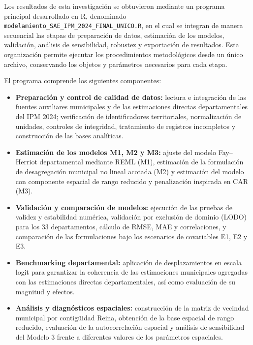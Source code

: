 Los resultados de esta investigación se obtuvieron mediante un programa principal desarrollado en R, denominado \texttt{modelamiento\_SAE\_IPM\_2024\_\allowbreak FINAL\_UNICO.R}, en el cual se integran de manera secuencial las etapas de preparación de datos, estimación de los modelos, validación, análisis de sensibilidad, robustez y exportación de resultados. Esta organización permite ejecutar los procedimientos metodológicos desde un único archivo, conservando los objetos y parámetros necesarios para cada etapa.

El programa comprende los siguientes componentes:

\begin{itemize}

    \item \textbf{Preparación y control de calidad de datos:} lectura e integración de las fuentes auxiliares municipales y de las estimaciones directas departamentales del IPM 2024; verificación de identificadores territoriales, normalización de unidades, controles de integridad, tratamiento de registros incompletos y construcción de las bases analíticas.

    \item \textbf{Estimación de los modelos M1, M2 y M3:} ajuste del modelo Fay--Herriot departamental mediante REML (M1), estimación de la formulación de desagregación municipal no lineal acotada (M2) y estimación del modelo con componente espacial de rango reducido y penalización inspirada en CAR (M3).

    \item \textbf{Validación y comparación de modelos:} ejecución de las pruebas de validez y estabilidad numérica, validación por exclusión de dominio (LODO) para los 33 departamentos, cálculo de RMSE, MAE y correlaciones, y comparación de las formulaciones bajo los escenarios de covariables E1, E2 y E3.

    \item \textbf{Benchmarking departamental:} aplicación de desplazamientos en escala logit para garantizar la coherencia de las estimaciones municipales agregadas con las estimaciones directas departamentales, así como evaluación de su magnitud y efectos.

    \item \textbf{Análisis y diagnósticos espaciales:} construcción de la matriz de vecindad municipal por contigüidad Reina, obtención de la base espacial de rango reducido, evaluación de la autocorrelación espacial y análisis de sensibilidad del Modelo 3 frente a diferentes valores de los parámetros espaciales.


\end{itemize}
